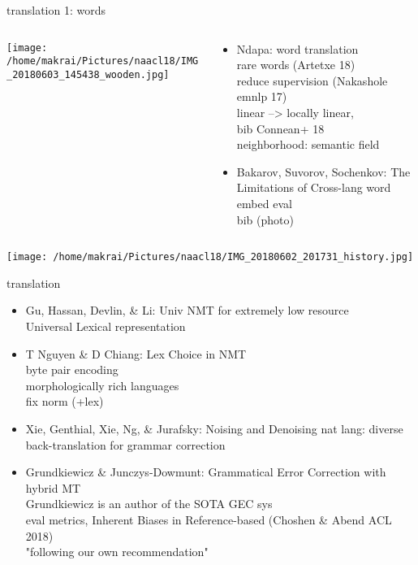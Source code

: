 \documentclass{beamer}
\begin{document}
\begin{frame}{translation 1: words}
  \begin{columns}
    \begin{column}{.35\textwidth}
      \centering 
      \texttt{[image: /home/makrai/Pictures/naacl18/IMG\_20180603\_145438\_wooden.jpg]}
    \end{column}
    \begin{column}{.65\textwidth}
      \begin{itemize} 
        \item Ndapa: word translation
          \\ rare words (Artetxe 18)
          \\ reduce supervision (Nakashole emnlp 17)
          \\ linear --> locally linear,
          \\ bib Connean+ 18
          \\ neighborhood: semantic field
        \item Bakarov, Suvorov, Sochenkov: The Limitations of Cross-lang word embed eval 
          \\ bib (photo)
      \end{itemize}
    \end{column}
  \end{columns}
\end{frame}

\begin{frame}
  \texttt{[image: /home/makrai/Pictures/naacl18/IMG\_20180602\_201731\_history.jpg]}
\end{frame}

\begin{frame}{translation}
  \begin{itemize}
    \item Gu, Hassan, Devlin, \& Li: Univ NMT for extremely low resource 
      \\ Universal Lexical representation
    \item T Nguyen \& D Chiang: Lex Choice in NMT 
      \\ byte pair encoding 
      \\ morphologically rich languages
      \\ fix norm (+lex)
    \item Xie, Genthial, Xie, Ng, \& Jurafsky: Noising and Denoising nat lang: 
      diverse back-translation for grammar correction
    \item Grundkiewicz \& Junczys-Dowmunt: Grammatical Error Correction with hybrid MT
      \\ Grundkiewicz is an author of the SOTA GEC sys
      \\ eval metrics, Inherent Biases in Reference-based (Choshen \& Abend ACL 2018)
      \\ "following our own recommendation"
  \end{itemize}
\end{frame}
\end{document}
